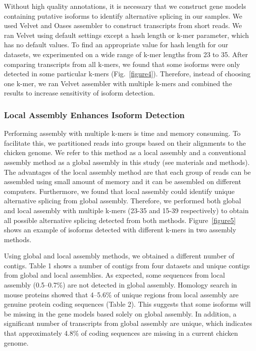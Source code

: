 \documentclass[10pt]{article}
\begin{document}
Without high quality annotations, it is necessary that we construct gene models containing putative isoforms to identify alternative splicing in our samples.
We used Velvet\cite{Zerbino:2008vu} and Oases assembler to construct transcripts from short reads.
We ran Velvet using default settings except a hash length or k-mer parameter, which has no default values.
To find an appropriate value for hash length for our datasets, we experimented on a wide range of k-mer lengths from 23 to 35.
After comparing transcripts from all k-mers, we found that some isoforms were only detected in some particular k-mers (Fig.~\ref{figure4}).
Therefore, instead of choosing one k-mer, we ran Velvet assembler with multiple k-mers and combined the results to increase sensitivity of isoform detection.

\subsubsection*{Local Assembly Enhances Isoform Detection}

Performing assembly with multiple k-mers is time and memory consuming.
To facilitate this, we partitioned reads into groups based on their alignments to the chicken genome.
We refer to this method as a local assembly and a conventional assembly method as a global assembly in this study (see materials and methods).
The advantages of the local assembly method are that each group of reads can be assembled using small amount of memory and it can be assembled on different computers.
Furthermore, we found that local assembly could identify unique alternative splicing from global assembly.
Therefore, we performed both global and local assembly with multiple k-mers (23-35 and 15-39 respectively) to obtain all possible alternative splicing detected from both methods.
Figure~\ref{figure5} shows an example of isoforms detected with different k-mers in two assembly methods.

Using global and local assembly methods, we obtained a different number of contigs.
Table 1 shows a number of contigs from four datasets and unique contigs from global and local assemblies.
As expected, some sequences from local assembly (0.5--0.7\%) are not detected in global assembly.
Homology search in mouse proteins showed that 4--5.6\% of unique regions from local assembly are genuine protein coding sequences (Table 2).
This suggests that some isoforms will be missing in the gene models based solely on global assembly.
In addition, a significant number of transcripts from global assembly are unique, which indicates that approximately 4.8\% of coding sequences are missing in a current chicken genome.
\end{document}

